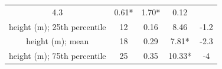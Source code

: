 \documentclass[]{article}
\begin{document}
\begin{longtable}[]{@{}ccccc@{}}
\begin{minipage}[t]{0.13\columnwidth}
4.3\strut
\end{minipage} & \begin{minipage}[t]{0.24\columnwidth}\centering\strut
0.61*\strut
\end{minipage} & \begin{minipage}[t]{0.08\columnwidth}\centering\strut
1.70*\strut
\end{minipage} & \begin{minipage}[t]{0.13\columnwidth}\centering\strut
0.12\strut
\end{minipage}\tabularnewline
\begin{minipage}[t]{0.28\columnwidth}\centering\strut
height (m); 25th percentile\strut
\end{minipage} & \begin{minipage}[t]{0.13\columnwidth}\centering\strut
12\strut
\end{minipage} & \begin{minipage}[t]{0.24\columnwidth}\centering\strut
0.16\strut
\end{minipage} & \begin{minipage}[t]{0.08\columnwidth}\centering\strut
8.46\strut
\end{minipage} & \begin{minipage}[t]{0.13\columnwidth}\centering\strut
-1.2\strut
\end{minipage}\tabularnewline
\begin{minipage}[t]{0.28\columnwidth}\centering\strut
height (m); mean\strut
\end{minipage} & \begin{minipage}[t]{0.13\columnwidth}\centering\strut
18\strut
\end{minipage} & \begin{minipage}[t]{0.24\columnwidth}\centering\strut
0.29\strut
\end{minipage} & \begin{minipage}[t]{0.08\columnwidth}\centering\strut
7.81*\strut
\end{minipage} & \begin{minipage}[t]{0.13\columnwidth}\centering\strut
-2.3\strut
\end{minipage}\tabularnewline
\begin{minipage}[t]{0.28\columnwidth}\centering\strut
height (m); 75th percentile\strut
\end{minipage} & \begin{minipage}[t]{0.13\columnwidth}\centering\strut
25\strut
\end{minipage} & \begin{minipage}[t]{0.24\columnwidth}\centering\strut
0.35\strut
\end{minipage} & \begin{minipage}[t]{0.08\columnwidth}\centering\strut
10.33*\strut
\end{minipage} & \begin{minipage}[t]{0.13\columnwidth}\centering\strut
-4\strut
\end{minipage}\tabularnewline
\bottomrule
\end{longtable}
\end{document}
